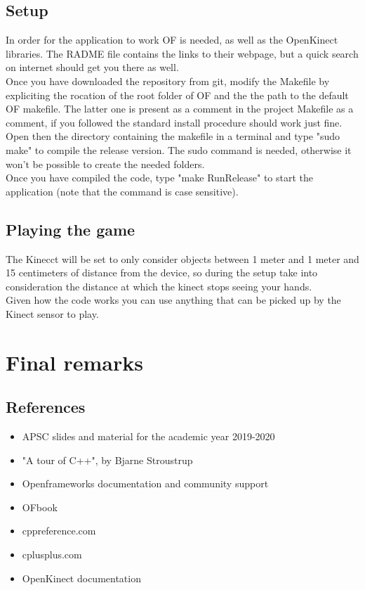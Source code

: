 \documentclass[]{article}
\begin{document}
\subsection{Setup}
In order for the application to work OF is needed, as well as the OpenKinect libraries. The RADME file contains the links to their webpage, but a quick search on internet should get you there as well.\\
Once you have downloaded the repository from git, modify the Makefile by expliciting the rocation of the root folder of OF and the the path to the default OF makefile. The latter one is present as a comment in the project Makefile as a comment, if you followed the standard install procedure should work just fine.\\  
Open then the directory containing the makefile in a terminal and type "sudo make" to compile the release version. The sudo command is needed, otherwise it won't be possible to create the needed folders.\\
Once you have compiled the code, type "make RunRelease" to start the application (note that the command is case sensitive).
\subsection{Playing the game}
The Kinecct will be set to only consider objects between 1 meter and 1 meter and 15 centimeters of distance from the device, so during the setup take into consideration the distance at which the kinect stops seeing your hands.\\
Given how the code works you can use anything that can be picked up by the Kinect sensor to play.

\newpage
\section{Final remarks}
\subsection{References}
\begin{itemize}
	\item APSC slides and material for the academic year 2019-2020
	\item "A tour of C++", by Bjarne Stroustrup
	\item Openframeworks documentation and community support
	\item OFbook
	\item cppreference.com
	\item cplusplus.com
	\item OpenKinect documentation
\end{itemize}
\end{document}
